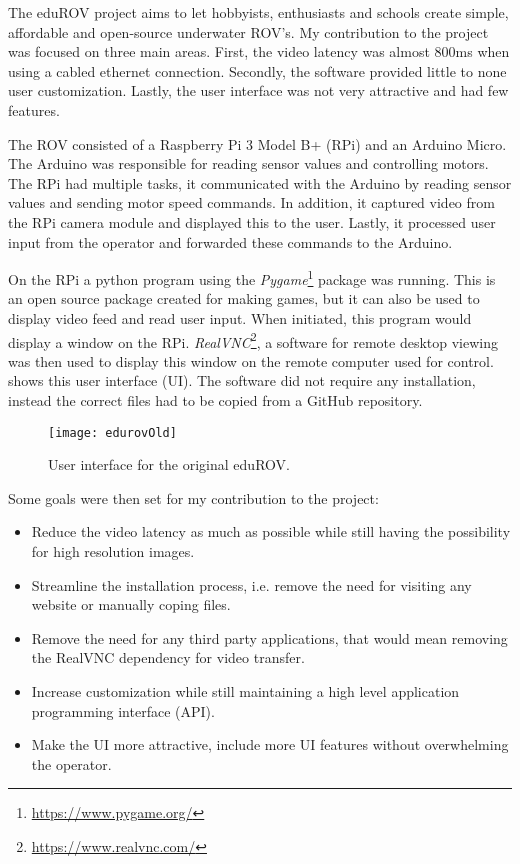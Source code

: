The eduROV project aims to let hobbyists, enthusiasts and schools create simple, affordable and open-source underwater ROV's. My contribution to the project was focused on three main areas. First, the video latency was almost 800ms when using a cabled ethernet connection. Secondly, the software provided little to none user customization. Lastly, the user interface was not very attractive and had few features.

The ROV consisted of a Raspberry Pi 3 Model B+ (RPi) and an Arduino Micro. The Arduino was responsible for reading sensor values and controlling motors. The RPi had multiple tasks, it communicated with the Arduino by reading sensor values and sending motor speed commands. In addition, it captured video from the RPi camera module and displayed this to the user. Lastly, it processed user input from the operator and forwarded these commands to the Arduino.

On the RPi a python program using the \emph{Pygame}\footnote{\url{https://www.pygame.org/}} package was running. This is an open source package created for making games, but it can also be used to display video feed and read user input. When initiated, this program would display a window on the RPi. \emph{RealVNC}\footnote{\url{https://www.realvnc.com/}}, a software for remote desktop viewing was then used to display this window on the remote computer used for control.  shows this user interface (UI). The software did not require any installation, instead the correct files had to be copied from a GitHub repository.

\begin{figure}[h!]
    \centering
    \texttt{[image: edurovOld]}
    \caption{User interface for the original eduROV.}
    \label{edurovOld}
\end{figure}

Some goals were then set for my contribution to the project:

\begin{itemize}
\item Reduce the video latency as much as possible while still having the possibility for high resolution images.

\item Streamline the installation process, i.e. remove the need for visiting any website or manually coping files.

\item Remove the need for any third party applications, that would mean removing the RealVNC dependency for video transfer.

\item Increase customization while still maintaining a high level application programming interface (API).

\item Make the UI more attractive, include more UI features without overwhelming the operator.
\end{itemize}

